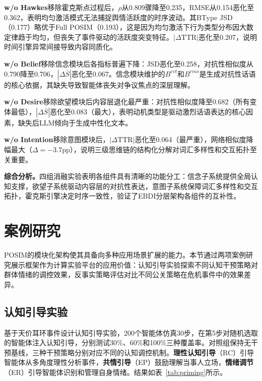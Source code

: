 \documentclass[a4paper,fleqn]{cas-sc}
\begin{document}
\textbf{w/o Hawkes}移除霍克斯点过程后，$\rho$从0.809骤降至0.235，RMSE从0.154恶化至0.362，表明均匀激活模式无法捕捉舆情活跃度的时序波动。其BType JSD（0.177）略优于Full POSIM（0.193），这是因为均匀激活下行为类型分布因大数定律趋于均匀，但丧失了事件驱动的活跃度突变特征。$|\Delta\text{TTR}|$恶化至0.207，说明时间引擎异常间接导致内容同质化。

\textbf{w/o Belief}移除信念模块后各指标普遍下降：JSD恶化至0.258，对抗性相似度从0.790降至0.706，$|\Delta\bar{S}|$恶化至0.067。信念模块维护的$B^{evt}$和$B^{emo}$是生成对抗性话语的核心依据，其缺失导致智能体丧失对争议焦点的深层理解。

\textbf{w/o Desire}移除欲望模块后内容层退化最严重：对抗性相似度降至0.682（所有变体最低），$|\Delta\bar{S}|$恶化至0.083（最大），表明动机类型是驱动激烈话语表达的核心因素，缺失后LLM倾向于生成中性化文本。

\textbf{w/o Intention}移除意图模块后，$|\Delta\text{TTR}|$恶化至0.064（最严重），网络相似度降幅最大（$\Delta=-3.7$pp），说明三级思维链的结构化分解对词汇多样性和交互拓扑至关重要。

\textbf{综合分析。}四组消融实验表明各组件具有清晰的功能分工：信念子系统提供全局认知支撑，欲望子系统驱动内容层的对抗性表达，意图子系统保障词汇多样性和交互拓扑，霍克斯引擎决定时序一致性，验证了EBDI分层架构各组件的互补性。

\section{案例研究}\label{sec:case}

POSIM的模块化架构使其具备向多种应用场景扩展的能力。本节通过两项案例研究展示框架作为计算实验平台的应用价值：认知引导实验探索不同认知干预策略对群体情绪的调控效果，反事实策略评估对比不同公关策略在危机事件中的效果差异。

\subsection{认知引导实验}

基于天价耳环事件设计认知引导实验，200个智能体仿真30步，在第5步对随机选取的智能体注入认知引导，分别测试30\%、60\%和100\%三种覆盖率。对照组保持无干预基线，三种干预策略分别对应不同的认知调控机制。\textbf{理性认知引导}（RC）引导智能体从多角度理性分析事件，\textbf{共情引导}（EP）鼓励理解当事人立场，\textbf{情绪调节}（ER）引导智能体识别和管理自身情绪。结果如表~\ref{tab:priming}所示。
\end{document}
